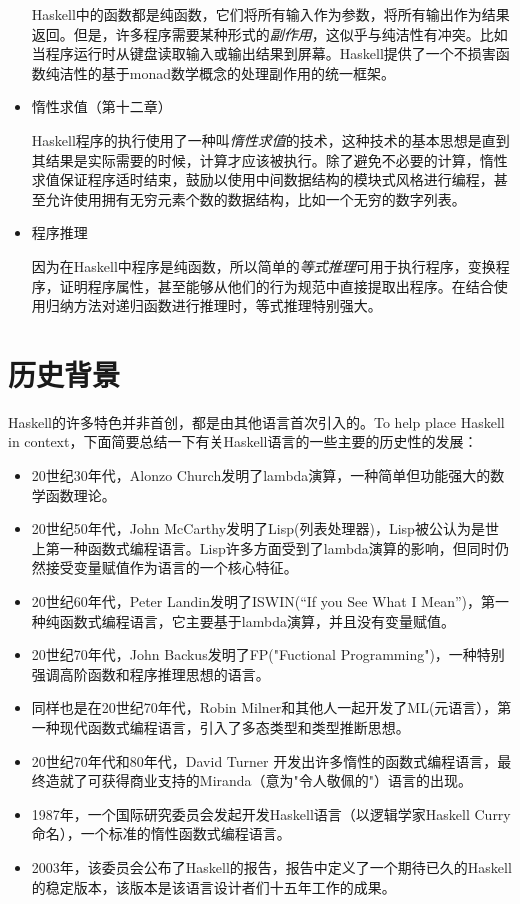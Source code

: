 \begin{itemize}
Haskell中的函数都是纯函数，它们将所有输入作为参数，将所有输出作为结果返回。但是，许多程序需要某种形式的\textit{副作用}，这似乎与纯洁性有冲突。比如当程序运行时从键盘读取输入或输出结果到屏幕。Haskell提供了一个不损害函数纯洁性的基于monad数学概念的处理副作用的统一框架。

\item 惰性求值（第十二章）

Haskell程序的执行使用了一种叫\textit{惰性求值}的技术，这种技术的基本思想是直到其结果是实际需要的时候，计算才应该被执行。除了避免不必要的计算，惰性求值保证程序适时结束，鼓励以使用中间数据结构的模块式风格进行编程，甚至允许使用拥有无穷元素个数的数据结构，比如一个无穷的数字列表。

\item 程序推理

因为在Haskell中程序是纯函数，所以简单的\textit{等式推理}可用于执行程序，变换程序，证明程序属性，甚至能够从他们的行为规范中直接提取出程序。在结合使用归纳方法对递归函数进行推理时，等式推理特别强大。
\end{itemize}

\section{历史背景}
Haskell的许多特色并非首创，都是由其他语言首次引入的。To help place Haskell in context，下面简要总结一下有关Haskell语言的一些主要的历史性的发展： 

\begin{itemize}
\item 20世纪30年代，Alonzo Church发明了lambda演算，一种简单但功能强大的数学函数理论。
\item 20世纪50年代，John McCarthy发明了Lisp(列表处理器)，Lisp被公认为是世上第一种函数式编程语言。Lisp许多方面受到了lambda演算的影响，但同时仍然接受变量赋值作为语言的一个核心特征。
\item 20世纪60年代，Peter Landin发明了ISWIN(“If you See What I Mean”)，第一种纯函数式编程语言，它主要基于lambda演算，并且没有变量赋值。
\item 20世纪70年代，John Backus发明了FP("Fuctional Programming")，一种特别强调高阶函数和程序推理思想的语言。
\item 同样也是在20世纪70年代，Robin Milner和其他人一起开发了ML(元语言），第一种现代函数式编程语言，引入了多态类型和类型推断思想。
\item 20世纪70年代和80年代，David Turner 开发出许多惰性的函数式编程语言，最终造就了可获得商业支持的Miranda（意为"令人敬佩的"）语言的出现。
\item 1987年，一个国际研究委员会发起开发Haskell语言（以逻辑学家Haskell Curry命名），一个标准的惰性函数式编程语言。
\item 2003年，该委员会公布了Haskell的报告，报告中定义了一个期待已久的Haskell的稳定版本，该版本是该语言设计者们十五年工作的成果。
\end{itemize}

